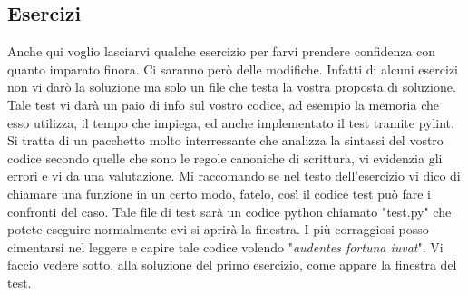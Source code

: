 \documentclass[10pt,a4paper]{article}
\begin{document}
\subsection{Esercizi}
Anche qui voglio lasciarvi qualche esercizio per farvi prendere confidenza con quanto imparato finora. Ci saranno però delle modifiche. Infatti di alcuni esercizi non vi darò la soluzione ma solo un file che testa la vostra proposta di soluzione. Tale test vi darà un paio di info sul vostro codice, ad esempio la memoria che esso utilizza, il tempo che impiega, ed anche implementato il test tramite pylint. Si tratta di un pacchetto molto interressante che analizza la sintassi del vostro codice secondo quelle che sono le regole canoniche di scrittura, vi evidenzia gli errori e vi da una valutazione. Mi raccomando se nel testo dell'esercizio vi dico di chiamare una funzione in un certo modo, fatelo, così il codice test può fare i confronti del caso. Tale file di test sarà un codice python chiamato "test.py" che potete eseguire normalmente evi si aprirà la finestra. I più corraggiosi posso cimentarsi nel leggere e capire tale codice volendo "\textit{audentes fortuna iuvat}". Vi faccio vedere sotto, alla soluzione del primo esercizio, come appare la finestra del test.\\
\end{document}
